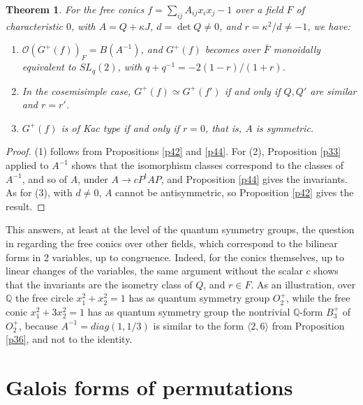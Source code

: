 \documentclass[11pt]{amsart}
\newtheorem{theorem}{Theorem}[section]
\theoremstyle{definition}
\begin{document}
\begin{theorem}
\label{t45}
For the free conics $f=\sum_{ij}A_{ij}x_ix_j-1$ over a field $F$ of characteristic $0$, with $A=Q+\kappa J$, $d=\det Q\neq0$, and $r=\kappa^2/d\neq-1$, we have:
\begin{enumerate}
\item $\mathcal O(G^+(f))_F=B(A^{-1})$, and $G^+(f)$ becomes over $\bar F$ monoidally equivalent to $SL_q(2)$, with $q+q^{-1}=-2(1-r)/(1+r)$.

\item In the cosemisimple case, $G^+(f)\simeq G^+(f')$ if and only if $Q,Q'$ are similar and $r=r'$.

\item $G^+(f)$ is of Kac type if and only if $r=0$, that is, $A$ is symmetric.
\end{enumerate}
\end{theorem}

\begin{proof}
(1) follows from Propositions \ref{p42} and \ref{p44}. For (2), Proposition \ref{p33} applied to $A^{-1}$ shows that the isomorphism classes correspond to the classes of $A^{-1}$, and so of $A$, under $A\to cP^tAP$, and Proposition \ref{p44} gives the invariants. As for (3), with $d\neq0$, $A$ cannot be antisymmetric, so Proposition \ref{p42} gives the result.
\end{proof}

This answers, at least at the level of the quantum symmetry groups, the question in \cite{fba} regarding the free conics over other fields, which correspond to the bilinear forms in 2 variables, up to congruence. Indeed, for the conics themselves, up to linear changes of the variables, the same argument without the scalar $c$ shows that the invariants are the isometry class of $Q$, and $r\in F$. As an illustration, over $\mathbb Q$ the free circle $x_1^2+x_2^2=1$ has as quantum symmetry group $O_2^+$, while the free conic $x_1^2+3x_2^2=1$ has as quantum symmetry group the nontrivial $\mathbb Q$-form $B_3^+$ of $O_2^+$, because $A^{-1}=diag(1,1/3)$ is similar to the form $\langle2,6\rangle$ from Proposition \ref{p36}, and not to the identity.

\section{Galois forms of permutations}
\end{document}
